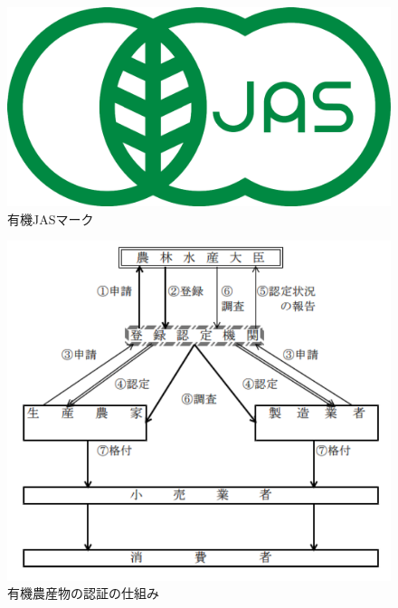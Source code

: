 \documentclass[11pt,dvipdfmx]{jreport}
\begin{document}
\begin{figure}[t]
        \centering
	\includegraphics[width=0.7\linewidth]{Haraguchi_fig/JASmark.pdf}
	\caption{有機JASマーク\protect\footnotemark[3]}
	\label{fig:JAS}
\end{figure}

\begin{figure}[t]
	\includegraphics[width=1.0\linewidth]{Haraguchi_fig/yuukijaszentai.pdf}
	\caption{有機農産物の認証の仕組み\protect\footnotemark[4]}
	\label{fig:yuukisikumi}
\end{figure}
\end{document}
